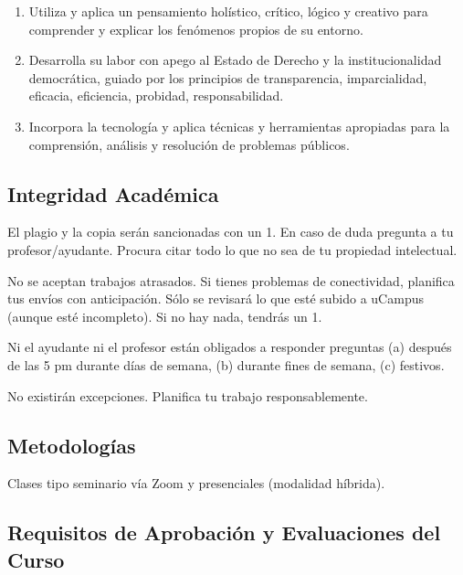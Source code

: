 \documentclass[letterpaper]{article}
\renewenvironment{itemize}{
  \begin{list}{}{
    \setlength{\leftmargin}{1.5em}
  }
}{
  \end{list}
}
\begin{document}
\begin{enumerate}
	\item Utiliza y aplica un pensamiento hol\'istico, cr\'itico, l\'ogico y creativo para comprender y explicar los fen\'omenos propios de su entorno.
	\item Desarrolla su labor con apego al Estado de Derecho y la institucionalidad democr\'atica, guiado por los principios de transparencia, imparcialidad, eficacia, eficiencia, probidad, responsabilidad. 
	\item Incorpora la tecnolog\'ia y aplica t\'ecnicas y herramientas apropiadas para la comprensi\'on, an\'alisis y resoluci\'on de problemas p\'ublicos.
\end{enumerate}


\subsection*{Integridad Acad\'emica}


\begin{itemize}
	\item[$\circ$] El plagio y la copia ser\'an sancionadas con un 1. En caso de duda pregunta a tu profesor/ayudante. Procura citar todo lo que no sea de tu propiedad intelectual.
	\item[$\circ$] No se aceptan trabajos atrasados. Si tienes problemas de conectividad, planifica tus env\'ios con anticipaci\'on. S\'olo se revisar\'a lo que est\'e subido a uCampus (aunque est\'e incompleto). Si no hay nada, tendr\'as un 1.
	\item[$\circ$] Ni el ayudante ni el profesor est\'an obligados a responder preguntas (a) despu\'es de las 5 pm durante d\'ias de semana, (b) durante fines de semana, (c) festivos.
\end{itemize}

\begin{itemize}
\item[{\color{red}\Pointinghand}] No existir\'an excepciones. Planifica tu trabajo responsablemente. 
\end{itemize}




\subsection*{Metodolog\'ias}

Clases tipo seminario v\'ia Zoom y presenciales (modalidad h\'ibrida).

\subsection*{Requisitos de Aprobaci\'on y Evaluaciones del Curso}
\end{document}
